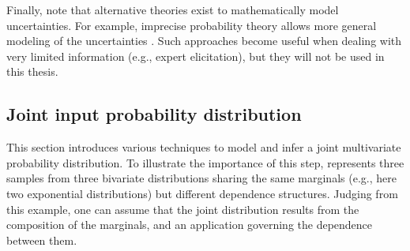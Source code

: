 Finally, note that alternative theories exist to mathematically model uncertainties. 
For example, imprecise probability theory allows more general modeling of the uncertainties \citep{beer_2013_imprecise_proba,schobi_2019_thesis,ajenjo_2023}. 
Such approaches become useful when dealing with very limited information (e.g., expert elicitation), but they will not be used in this thesis. 


\subsection{Joint input probability distribution}

This section introduces various techniques to model and infer a joint multivariate probability distribution. 
To illustrate the importance of this step,  represents three  samples from three bivariate distributions sharing the same marginals (e.g., here two exponential distributions) but different dependence structures. 
Judging from this example, one can assume that the joint distribution results from the composition of the marginals, and an application governing the dependence between them. 
